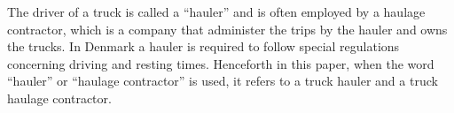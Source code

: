 The driver of a truck is called a ``hauler'' and is often employed by a haulage contractor, which is a company that administer the trips by the hauler and owns the trucks.
In Denmark a hauler is required to follow special regulations concerning driving and resting times\cite{haulierSleepLaw}.
Henceforth in this paper, when the word ``hauler'' or ``haulage contractor'' is used, it refers to a truck hauler and a truck haulage contractor.
